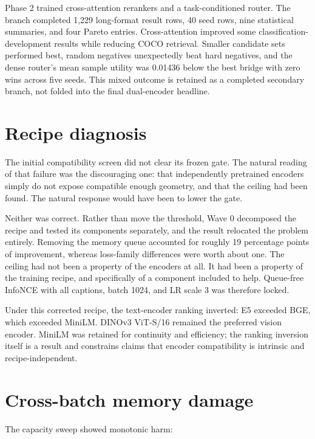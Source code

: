 \documentclass[11pt,a4paper,oneside]{report}
\begin{document}
Phase 2 trained cross-attention rerankers and a task-conditioned router. The branch completed 1,229 long-format result rows, 40 seed rows, nine statistical summaries, and four Pareto entries. Cross-attention improved some classification-development results while reducing COCO retrieval. Smaller candidate sets performed best, random negatives unexpectedly beat hard negatives, and the dense router's mean sample utility was 0.01436 below the best bridge with zero wins across five seeds. This mixed outcome is retained as a completed secondary branch, not folded into the final dual-encoder headline.

\section{Recipe diagnosis}
The initial compatibility screen did not clear its frozen gate. The natural reading of that failure was the discouraging one: that independently pretrained encoders simply do not expose compatible enough geometry, and that the ceiling had been found. The natural response would have been to lower the gate.

Neither was correct. Rather than move the threshold, Wave 0 decomposed the recipe and tested its components separately, and the result relocated the problem entirely. Removing the memory queue accounted for roughly 19 percentage points of improvement, whereas loss-family differences were worth about one. The ceiling had not been a property of the encoders at all. It had been a property of the training recipe, and specifically of a component included to help. Queue-free InfoNCE with all captions, batch 1024, and LR scale 3 was therefore locked.

Under this corrected recipe, the text-encoder ranking inverted: E5 exceeded BGE, which exceeded MiniLM. DINOv3 ViT-S/16 remained the preferred vision encoder. MiniLM was retained for continuity and efficiency; the ranking inversion itself is a result and constrains claims that encoder compatibility is intrinsic and recipe-independent.

\section{Cross-batch memory damage}
The capacity sweep showed monotonic harm:
\end{document}
